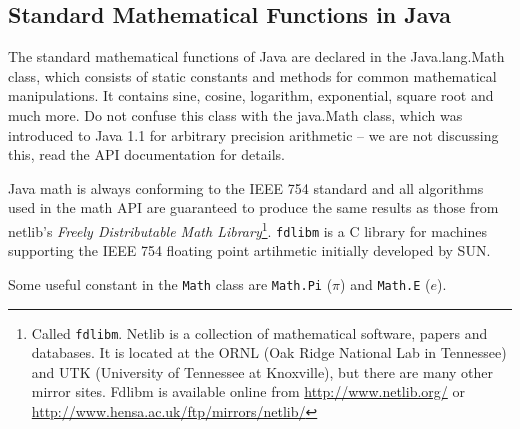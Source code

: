 \subsection{Standard Mathematical Functions in Java}
\label{sec:Standard_Math}

The standard mathematical functions of Java are declared in the 
Java.lang.Math class, which consists of static constants and methods
for common mathematical manipulations. 
It contains sine, cosine, logarithm, exponential,
square root and much more. Do not confuse this class with the
java.Math class, which was introduced to Java 1.1 for arbitrary
precision arithmetic -- we are not discussing this, read the
API documentation for details.

Java math is always conforming to the IEEE 754 standard and all
algorithms used in the math API are guaranteed to produce the
same results as those from netlib's 
\emph{Freely Distributable Math Library}\footnote{Called \texttt{fdlibm}.
Netlib is a collection of mathematical software, papers and databases.
It is located at the ORNL (Oak Ridge National Lab in Tennessee) and UTK (University
of Tennessee at Knoxville), but there are many other mirror sites.
Fdlibm is available online from 
\href{http://www.netlib.org/}{http://www.netlib.org/} or
\href{http://www.hensa.ac.uk/ftp/mirrors/netlib/}%
           {http://www.hensa.ac.uk/ftp/mirrors/netlib/}}.
\verb|fdlibm| is a C library for machines supporting the IEEE 754 floating
point artihmetic initially developed by SUN.

Some useful constant in the \verb|Math| class  are \verb|Math.Pi|
($\pi$) and \verb|Math.E| ($e$).




